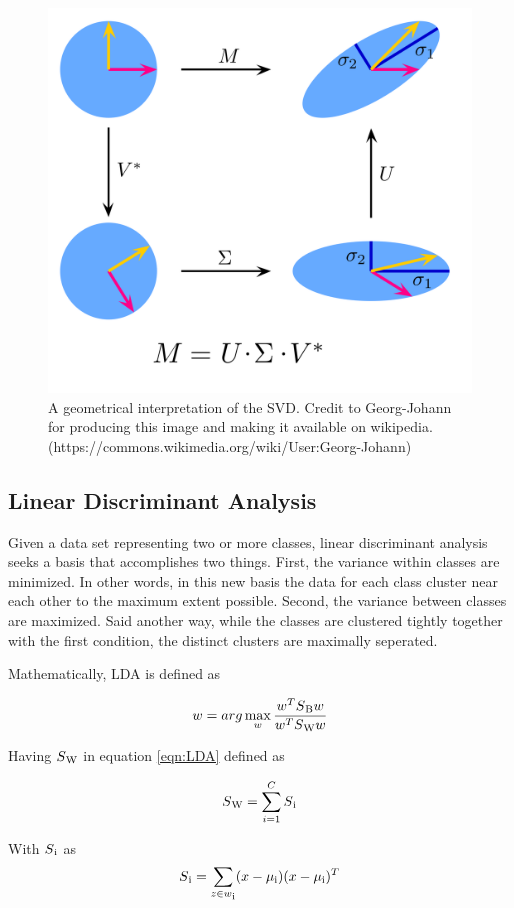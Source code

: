 \documentclass{article}
\begin{document}
\begin{figure}
    \centering
    \includegraphics[width=0.5\linewidth]{Figures/SVD.png}
    \caption{A geometrical interpretation of the SVD.  Credit to Georg-Johann for producing this image and making it available on wikipedia.  (https://commons.wikimedia.org/wiki/User:Georg-Johann)}
    \label{fig:CumulativeVariance}
\end{figure}


\subsection{Linear Discriminant Analysis}
Given a data set representing two or more classes, linear discriminant analysis seeks a basis that accomplishes two things.  First, the variance within classes are minimized.  In other words, in this new basis the data for each class cluster near each other to the maximum extent possible.  Second, the variance between classes are maximized.  Said another way, while the classes are clustered tightly together with the first condition, the distinct clusters are maximally seperated.  

Mathematically, LDA is defined as

\begin{equation}
w = arg \max_{w} \frac{w^{T}S\textsubscript{B}w}{w^{T}S\textsubscript{W}w}
\label{eqn:LDA}
\end{equation}

Having $S\textsubscript{W}$ in equation \ref{eqn:LDA} defined as

\begin{equation}
S\textsubscript{W} = \sum\limits_{i=1}^{C} S\textsubscript{i} 
\end{equation}

With $S\textsubscript{i}$ as
\begin{equation}
S\textsubscript{i} = \sum\limits_{z \in w\textsubscript{i}} (x-\mu\textsubscript{i})(x-\mu\textsubscript{i})^T
\end{equation}
\end{document}
